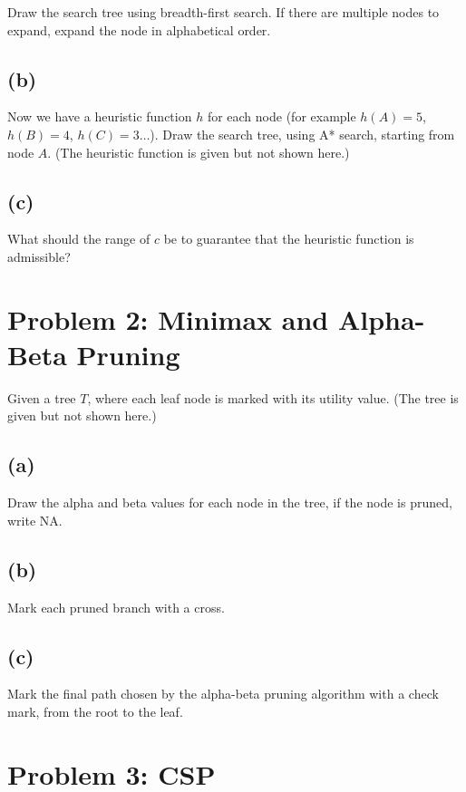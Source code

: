 \documentclass[a4paper,12pt]{article}
\begin{document}
Draw the search tree using breadth-first search. If there are multiple nodes to expand, expand the node in alphabetical order.

\subsection*{(b)}

Now we have a heuristic function $h$ for each node (for example $h(A) = 5$, $h(B) = 4$, $h(C) = 3 \ldots$). Draw the search tree, using A* search, starting from node $A$. (The heuristic function is given but not shown here.)

\subsection*{(c)}

What should the range of $c$ be to guarantee that the heuristic function is admissible?

\section*{Problem 2: Minimax and Alpha-Beta Pruning}

Given a tree $T$, where each leaf node is marked with its utility value. (The tree is given but not shown here.)

\subsection*{(a)}

Draw the alpha and beta values for each node in the tree, if the node is pruned, write NA.

\subsection*{(b)}

Mark each pruned branch with a cross.

\subsection*{(c)}

Mark the final path chosen by the alpha-beta pruning algorithm with a check mark, from the root to the leaf.

\section*{Problem 3: CSP}
\end{document}

